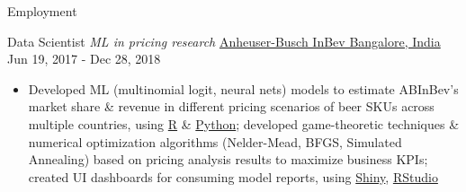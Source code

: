 \documentclass[]{mcdowellcv}
\begin{document}
\begin{cvsection}{Employment}
  \begin{cvsubsection}
    {Data Scientist \linebreak \textit{ML in pricing research}}
    {\href{https://www.abinbev-india.com/}{Anheuser-Busch InBev \linebreak Bangalore, India}}
    {Jun 19, 2017 - Dec 28, 2018}
    \begin{itemize}
      \item
            Developed ML (multinomial logit, neural nets) models to estimate
            ABInBev's market share \& revenue in different pricing scenarios of
            beer SKUs across multiple countries, using
            \href{https://www.r-project.org/about.html}{R} \&
            \href{https://www.python.org/}{Python}; developed game-theoretic
            techniques \& numerical optimization algorithms (Nelder-Mead, BFGS,
            Simulated Annealing) based on pricing analysis results to maximize
            business KPIs; created UI dashboards for consuming model reports,
            using \href{https://shiny.rstudio.com/}{Shiny},
            \href{https://posit.co/}{RStudio}
    \end{itemize}
  \end{cvsubsection}
\end{cvsection}
\end{document}
